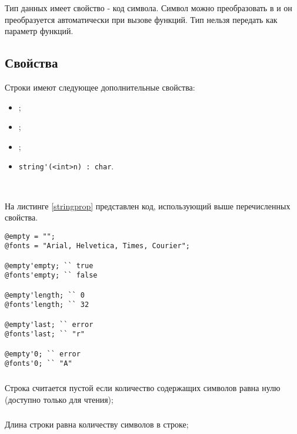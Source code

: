 \documentclass[a4paper, 14pt]{extarticle}
\newenvironment{icItems}
	{ \begin{itemize} [noitemsep,nolistsep] }
	{ \end{itemize} }
\begin{document}
Тип данных \chartype{} имеет свойство  - код символа. Символ можно преобразовать в \str{} и он преобразуется автоматически при вызове функций. Тип \chartype{} нельзя передать как параметр функций.

\subsection{Свойства}

Строки имеют следующее дополнительные свойства:
\begin{icItems}
\item
	;
\item
	;
\item
	;
\item
	\lstinline|string'(<int>n) : char|.
\end{icItems}

\

На листинге \ref{stringprop} представлен код, использующий выше перечисленных свойства.

\begin{lstlisting}[caption=Свойства класса string, label=stringprop]
@empty = "";
@fonts = "Arial, Helvetica, Times, Courier";

@empty'empty; `` true
@fonts'empty; `` false

@empty'length; `` 0
@fonts'length; `` 32

@empty'last; `` error
@fonts'last; `` "r"

@empty'0; `` error
@fonts'0; `` "A"
\end{lstlisting}

\subsubsection{}

Строка считается пустой если количество содержащих символов равна нулю (доступно только для чтения);

\subsubsection{}

Длина строки равна количеству символов в строке;

\subsubsection{}
\end{document}
